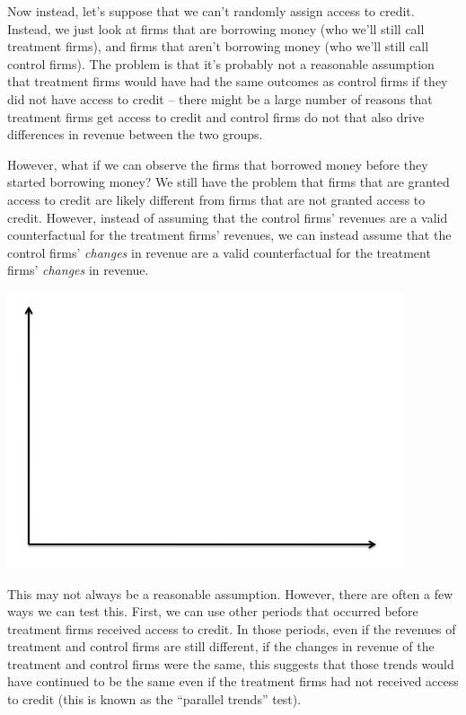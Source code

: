 \documentclass[12pt,english]{article}
\begin{document}
Now instead, let's suppose that we can't randomly assign access to credit. Instead, we just look at firms that are borrowing money (who we'll still call treatment firms), and firms that aren't borrowing money (who we'll still call control firms). The problem is that it's probably not a reasonable assumption that treatment firms would have had the same outcomes as control firms if they did not have access to credit --  there might be a large number of reasons that treatment firms get access to credit and control firms do not that also drive differences in revenue between the two groups.

However, what if we can observe the firms that borrowed money before they started borrowing money? We still have the problem that firms that are granted access to credit are likely different from firms that are not granted access to credit. However, instead of assuming that the control firms' revenues are a valid counterfactual for the treatment firms' revenues, we can instead assume that the control firms' \textit{changes} in revenue are a valid counterfactual for the treatment firms' \textit{changes} in revenue.

\begin{center}
	\begin{adjustbox}{
			max width=0.65\textwidth,
		}
		\includegraphics{axes.png}
	\end{adjustbox}
\end{center}

This may not always be a reasonable assumption. However, there are often a few ways we can test this. First, we can use other periods that occurred before treatment firms received access to credit. In those periods, even if the revenues of treatment and control firms are still different, if the changes in revenue of the treatment and control firms were the same, this suggests that those trends would have continued to be the same even if the treatment firms had not received access to credit (this is known as the ``parallel trends'' test).
\end{document}
